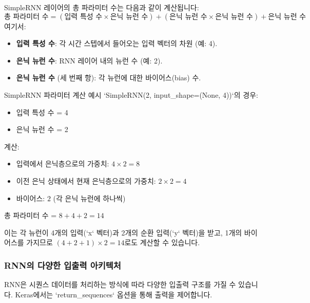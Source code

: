 \documentclass[11pt,a4paper]{article}
\begin{document}
\begin{tcolorbox}[title=\textbf{SimpleRNN 파라미터 계산 공식}, colback=myblue!10!white, colframe=myblue!75!black]
SimpleRNN 레이어의 총 파라미터 수는 다음과 같이 계산됩니다:
$$ \text{총 파라미터 수} = (\text{입력 특성 수} \times \text{은닉 뉴런 수}) + (\text{은닉 뉴런 수} \times \text{은닉 뉴런 수}) + \text{은닉 뉴런 수} $$
여기서:
\begin{itemize}
    \item \textbf{입력 특성 수}: 각 시간 스텝에서 들어오는 입력 벡터의 차원 (예: 4).
    \item \textbf{은닉 뉴런 수}: RNN 레이어 내의 뉴런 수 (예: 2).
    \item \textbf{은닉 뉴런 수} (세 번째 항): 각 뉴런에 대한 바이어스(bias) 수.
\end{itemize}
\end{tcolorbox}

\begin{examplebox}{SimpleRNN 파라미터 계산 예시}
`SimpleRNN(2, input_shape=(None, 4))`의 경우:
\begin{itemize}
    \item 입력 특성 수 = 4
    \item 은닉 뉴런 수 = 2
\end{itemize}
계산:
\begin{itemize}
    \item 입력에서 은닉층으로의 가중치: $4 \times 2 = 8$
    \item 이전 은닉 상태에서 현재 은닉층으로의 가중치: $2 \times 2 = 4$
    \item 바이어스: $2$ (각 은닉 뉴런에 하나씩)
\end{itemize}
총 파라미터 수 = $8 + 4 + 2 = 14$

이는 각 뉴런이 4개의 입력(`x` 벡터)과 2개의 순환 입력(`y` 벡터)을 받고, 1개의 바이어스를 가지므로 $(4+2+1) \times 2 = 14$로도 계산할 수 있습니다.
\end{examplebox}

\subsubsection{RNN의 다양한 입출력 아키텍처}
RNN은 시퀀스 데이터를 처리하는 방식에 따라 다양한 입출력 구조를 가질 수 있습니다. Keras에서는 `return_sequences` 옵션을 통해 출력을 제어합니다.
\end{document}
